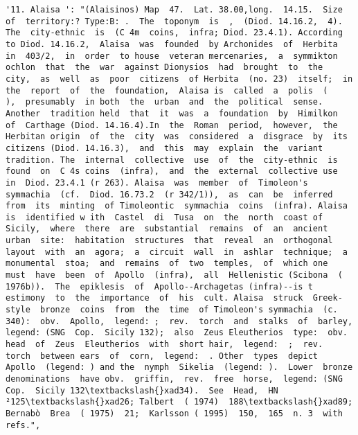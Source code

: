 \documentclass[11pt]{article}
\begin{document}
\begin{Verbatim}[commandchars=\\\{\}]
         '11. Alaisa ': "(Alaisinos) Map  47.  Lat. 38.00,long.  14.15.  Size of  territory:? Type:B: .  The  toponym  is  ,  (Diod. 14.16.2,  4).  The  city-ethnic  is  (C 4m  coins,  infra; Diod. 23.4.1). According  to Diod. 14.16.2,  Alaisa  was  founded  by Archonides  of  Herbita  in  403/2,  in  order  to house  veteran mercenaries,  a  symmikton  ochlon  that  the  war  against Dionysios  had  brought  to  the  city,  as  well  as  poor  citizens  of Herbita  (no. 23)  itself;  in  the  report  of  the  foundation,  Alaisa is  called  a  polis  (       ),  presumably  in both  the  urban  and  the  political  sense.  Another  tradition held  that  it  was  a  foundation  by  Himilkon  of  Carthage (Diod. 14.16.4).In  the  Roman  period,  however,  the  Herbitan origin  of  the  city  was  considered  a  disgrace  by  its  citizens (Diod. 14.16.3),  and  this  may  explain  the  variant  tradition. The  internal  collective  use  of  the  city-ethnic  is  found  on  C 4s coins  (infra),  and  the  external  collective use  in  Diod. 23.4.1 (r 263). Alaisa  was  member  of  Timoleon's symmachia  (cf.  Diod. 16.73.2  (r 342/1)),  as  can  be  inferred  from  its  minting  of Timoleontic  symmachia  coins  (infra). Alaisa  is  identified w ith  Castel  di  Tusa  on  the  north  coast of  Sicily,  where  there  are  substantial  remains  of  an  ancient urban  site:  habitation  structures  that  reveal  an  orthogonal layout  with  an  agora;  a  circuit  wall  in  ashlar  technique;  a monumental  stoa;  and  remains  of  two  temples,  of  which one  must  have  been  of  Apollo  (infra),  all  Hellenistic (Scibona  ( 1976b)).  The  epiklesis  of  Apollo--Archagetas (infra)--is t estimony  to  the  importance  of  his  cult. Alaisa  struck  Greek-style  bronze  coins  from  the  time  of Timoleon's symmachia  (c. 340):  obv.  Apollo,  legend: ;  rev.  torch  and  stalks  of  barley,  legend: (SNG  Cop.  Sicily 132);  also  Zeus Eleutherios  type:  obv.  head  of  Zeus  Eleutherios  with  short hair,  legend:  ;  rev.  torch  between ears  of  corn,  legend:  . Other  types  depict  Apollo  (legend: ) and the  nymph  Sikelia  (legend: ).  Lower  bronze denominations  have obv.  griffin,  rev.  free  horse,  legend: (SNG  Cop.  Sicily 132\textbackslash{}xad34).  See  Head,  HN ²125\textbackslash{}xad26; Talbert  ( 1974)  188\textbackslash{}xad89;  Bernabò  Brea  ( 1975)  21;  Karlsson ( 1995)  150,  165  n. 3  with  refs.",

\end{Verbatim}
\end{document}
